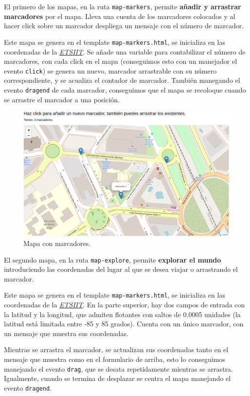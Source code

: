 \documentclass{article}
\begin{document}
El primero de los mapas, en la ruta \texttt{map-markers}, permite
\textbf{añadir y arrastrar marcadores} por el mapa. Lleva una cuenta
de los marcadores colocados y al hacer click sobre un marcador
despliega un mensaje con el número de marcador.

Este mapa se genera en el template \texttt{map-markers.html}, se
inicializa en las coordenadas de la
\href{https://etsiit.ugr.es/}{\textit{ETSIIT}}. Se añade una variable
para contabilizar el número de marcadores, con cada click en el mapa
(conseguimos esto con un manejador el evento \texttt{click}) se genera
un nuevo, marcador arrastrable con su número correspondiente, y se
acualiza el contador de marcador. También manegando el evento
\texttt{dragend} de cada marcador, conseguimos que el mapa se
recoloque cuando se arrastre el marcador a una posición.
  
\begin{figure}[H]
  \centering
  \includegraphics[width=180mm]{imgs/map-markers}
  \caption{Mapa con marcadores.}
  \label{fig:map-markers}
\end{figure}

El segundo mapa, en la ruta \texttt{map-explore}, permite
\textbf{explorar el mundo} introduciendo las coordenadas del lugar al
que se desea viajar o arrastrando el marcador.

Este mapa se genera en el template \texttt{map-markers.html}, se
inicializa en las coordenadas de la
\href{https://etsiit.ugr.es/}{\textit{ETSIIT}}. En la parte superior,
hay dos campos de entrada con la latitud y la longitud, que admiten
flotantes con saltos de 0.0005 unidades (la latitud está limitada
entre -85 y 85 grados). Cuenta con un único marcador, con un mensaje
que muestra sus coordenadas.

Mientras se arrastra el marcador, se actualizan sus coordenadas tanto
en el mensaje que muestra como en el formulario de arriba, esto lo
conseguimos manejando el evento \texttt{drag}, que se desata
repetidamente mientras se arrastra. Igualmente, cuando se termina de
desplazar se centra el mapa manejando el evento \texttt{dragend}.
\end{document}
